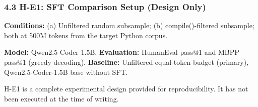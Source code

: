 \subsubsection{4.3 H-E1: SFT Comparison Setup (Design Only)}

\textbf{Conditions:} (a) Unfiltered random subsample; (b) compile()-filtered subsample; both at
500M tokens from the target Python corpus.

\textbf{Model:} Qwen2.5-Coder-1.5B. \textbf{Evaluation:} HumanEval pass@1 and MBPP pass@1 (greedy
decoding). \textbf{Baseline:} Unfiltered equal-token-budget (primary), Qwen2.5-Coder-1.5B base
without SFT.

H-E1 is a complete experimental design provided for reproducibility. It has not been executed
at the time of writing.

